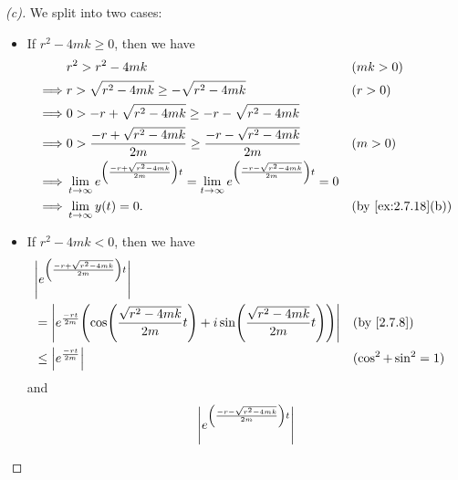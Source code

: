 \begin{proof}[(c)]
	We split into two cases:
	\begin{itemize}
		\item If \(r^2 - 4mk \geq 0\), then we have
		      \begin{align*}
			               & r^2 > r^2 - 4mk                                                                                                                       &  & (mk > 0)          \\
			      \implies & r > \sqrt{r^2 - 4mk} \geq -\sqrt{r^2 - 4mk}                                                                                           &  & (r > 0)           \\
			      \implies & 0 > -r + \sqrt{r^2 - 4mk} \geq -r - \sqrt{r^2 - 4mk}                                                                                                         \\
			      \implies & 0 > \frac{-r + \sqrt{r^2 - 4mk}}{2m} \geq \frac{-r - \sqrt{r^2 - 4mk}}{2m}                                                            &  & (m > 0)           \\
			      \implies & \lim_{t \to \infty} e^{\pa{\frac{-r + \sqrt{r^2 - 4mk}}{2m}} t} = \lim_{t \to \infty} e^{\pa{\frac{-r - \sqrt{r^2 - 4mk}}{2m}} t} = 0                        \\
			      \implies & \lim_{t \to \infty} y(t) = 0.                                                                                                         &  & \by{ex:2.7.18}[b]
		      \end{align*}
		\item If \(r^2 - 4mk < 0\), then we have
		      \begin{align*}
			       & \abs{e^{\pa{\frac{-r + \sqrt{r^2 - 4mk}}{2m}} t}}                                                                                            \\
			       & = \abs{e^{\frac{-rt}{2m}} \pa{\cos\pa{\frac{\sqrt{r^2 - 4mk}}{2m} t} + i \sin\pa{\frac{\sqrt{r^2 - 4mk}}{2m} t}}} &  & \by{2.7.8}            \\
			       & \leq \abs{e^{\frac{-rt}{2m}}}                                                                                     &  & (\cos^2 + \sin^2 = 1)
		      \end{align*}
		      and
		      \begin{align*}
			       & \abs{e^{\pa{\frac{-r - \sqrt{r^2 - 4mk}}{2m}} t}}                                                                                              \\

\end{align*}
\end{itemize}
\end{proof}
